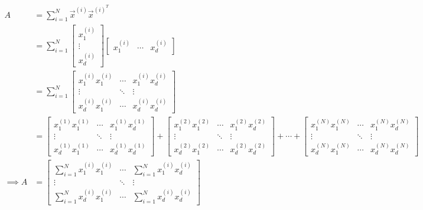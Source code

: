 \documentclass{article}
\begin{document}
{\subsection{}
\begin{align*}
A &= \sum_{i=1}^N \vec{x}^{(i)}   \vec{x}^{(i)^T} \\
&= \sum_{i=1}^N \begin{bmatrix} x_1^{(i)} \\ \vdots \\ x_d^{(i)} \end{bmatrix} \begin{bmatrix} x_1^{(i)} & \cdots & x_d^{(i)} \end{bmatrix} \\ &= \sum_{i=1}^N \begin{bmatrix}
x_1^{(i)} x_1^{(i)} & \cdots & x_1^{(i)} x_d^{(i)} \\
\vdots & \ddots & \vdots \\
x_d^{(i)} x_1^{(i)} & \cdots & x_d^{(i)} x_d^{(i)} 
\end{bmatrix} \\
&= \begin{bmatrix}
x_1^{(1)} x_1^{(1)} & \cdots & x_1^{(1)} x_d^{(1)} \\
\vdots & \ddots & \vdots \\
x_d^{(1)} x_1^{(1)} & \cdots & x_d^{(1)} x_d^{(1)} 
\end{bmatrix}
+
\begin{bmatrix}
x_1^{(2)} x_1^{(2)} & \cdots & x_1^{(2)} x_d^{(2)} \\
\vdots & \ddots & \vdots \\
x_d^{(2)} x_1^{(2)} & \cdots & x_d^{(2)} x_d^{(2)} 
\end{bmatrix}
+ \cdots +
\begin{bmatrix}
x_1^{(N)} x_1^{(N)} & \cdots & x_1^{(N)} x_d^{(N)} \\
\vdots & \ddots & \vdots \\
x_d^{(N)} x_1^{(N)} & \cdots & x_d^{(N)} x_d^{(N)} 
\end{bmatrix} \\
\implies A &=  \begin{bmatrix}
\sum_{i=1}^N x_1^{(i)} x_1^{(i)} & \cdots & \sum_{i=1}^N x_1^{(i)} x_d^{(i)} \\
\vdots & \ddots & \vdots \\
\sum_{i=1}^N x_d^{(i)} x_1^{(i)} & \cdots & \sum_{i=1}^N x_d^{(i)} x_d^{(i)} 
\end{bmatrix}
\end{align*}






}
\end{document}
